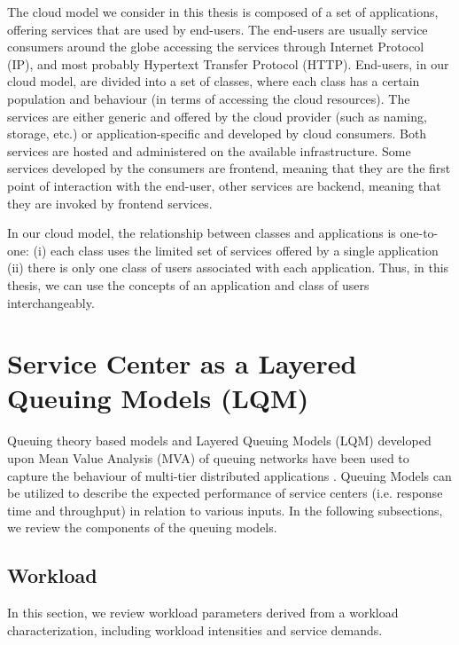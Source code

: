   The cloud model we consider in this thesis is composed of a set of applications, offering services that are used by end-users. The end-users are usually service consumers around the globe accessing the services through Internet Protocol (IP), and most probably Hypertext Transfer Protocol (HTTP). End-users, in our cloud model, are divided into a set of classes, where each class has a certain population and behaviour (in terms of accessing the cloud resources).
  The services are either generic and offered by the cloud provider (such as naming, storage, etc.) or application-specific and developed by cloud consumers. Both services are hosted and administered on the available infrastructure. %
 Some services developed by the consumers are frontend, meaning that they are the first point of interaction with the end-user, other services are backend, meaning that they are invoked by frontend services.   
  
     In our cloud model, the relationship between classes and applications is one-to-one:  (i) each class uses the limited set of services offered by a single application (ii) there is only one class of users associated with each application.  
     Thus, in this thesis, we can use the concepts of an application and class of users interchangeably. 
    
\section{Service Center as a Layered Queuing Models (LQM)}  
\label{sec:layered-queuing-models-introduction}   
Queuing theory based models \cite{petriu_approximate_1994,petriu_approximate_2004,badidi-queuing-2005} and Layered Queuing Models (LQM) \cite{rolia_method_1995,ramesh_multi-layer_1998} developed upon Mean Value Analysis (MVA) of queuing networks have been used to capture the behaviour of multi-tier distributed applications \cite{litoiu_hierarchical_2005, xu_performance_2006,hamoun_ghanbari_tuning,liu_layered_????}. 
Queuing Models can be utilized to describe the expected performance of service centers (i.e. response time and throughput) in relation to various inputs. In the following subsections, we review the components of the queuing models.  

\subsection{Workload} 
\label{sec:workload-background}  
  In this section, we review workload parameters derived from a workload characterization, including workload intensities and service demands.    
 
